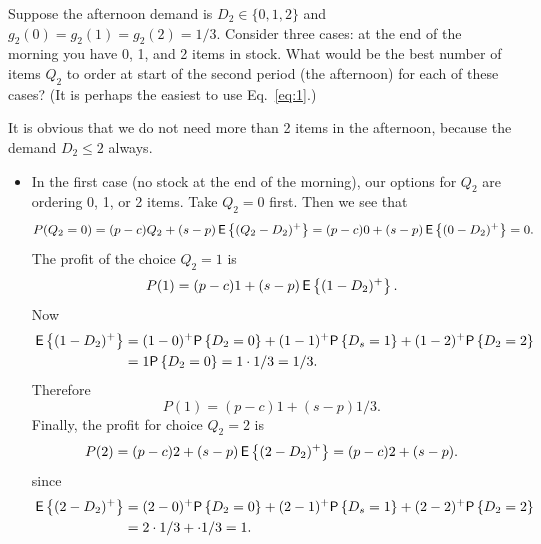 \begin{question}
Suppose the afternoon demand is $D_2\in \{0,1,2\}$ and $g_2(0)=g_2(1)=g_2(2)=1/3$.  Consider  three cases: at the end of the morning you have  0, 1, and 2 items in stock. What would be the best number of items $Q_2$ to order at start of the second period (the afternoon) for each of these cases? (It is perhaps the easiest to use Eq.~\eqref{eq:1}.)

\begin{solution}
	It is obvious that we do not need more than 2 items in the afternoon, because the demand $D_2\leq 2$ always.
	
	\begin{itemize}
	
	\item In the first case (no stock at the end of the morning), our options for $Q_2$ are ordering 0, 1, or 2 items. Take $Q_2=0$ first. Then we see that 
    \begin{equation*}
P(Q_2=0) = (p -c)Q_2  + (s-p)\,\mathsf{E}\left\{(Q_2-D_2)^+\right\} = (p -c) 0   + (s-p)\,\mathsf{E}\left\{(0-D_2)^+\right\} = 0.
\end{equation*}
The profit of the choice $Q_2=1$ is 
    \begin{equation*}
P(1) = (p -c)1  + (s-p)\,\mathsf{E}\left\{(1-D_2)^+\right\}. 
\end{equation*}
Now
\begin{equation*}
  \begin{split}
\E{(1-D_2)^+}
&=(1-0)^+\P{D_2=0} + (1-1)^+\P{D_s=1} + (1-2)^+ \P{D_2=2} \\
&= 1 \P{D_2=0} = 1\cdot 1/3 = 1/3.
  \end{split}
\end{equation*}
Therefore
    \begin{equation*}
P(1) = (p -c)1  + (s-p) 1/3.
  \end{equation*}
Finally, the profit for choice $Q_2=2$ is 
    \begin{equation*}
P(2) = (p -c)2  + (s-p)\,\mathsf{E}\left\{(2-D_2)^+\right\} = (p-c)2 + (s-p).
\end{equation*}
since
\begin{equation*}
  \begin{split}
\E{(2-D_2)^+}
&=(2-0)^+\P{D_2=0} + (2-1)^+\P{D_s=1} + (2-2)^+ \P{D_2=2} \\
&= 2\cdot 1/3 + \cdot 1/3 = 1.
  \end{split}
\end{equation*}


\end{itemize}
\end{solution}
\end{question}
